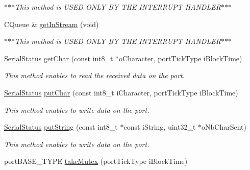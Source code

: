 \begin{DoxyCompactItemize}
\begin{DoxyCompactList}\small\item\em $\ast$$\ast$$\ast$\-This method is \-U\-S\-E\-D \-O\-N\-L\-Y \-B\-Y \-T\-H\-E \-I\-N\-T\-E\-R\-R\-U\-P\-T \-H\-A\-N\-D\-L\-E\-R$\ast$$\ast$$\ast$ \end{DoxyCompactList}\item 
\hypertarget{class_async_serial_port1_aca8bcbacddd2d46ca9460c3d9b232752}{\-C\-Queue \& \hyperlink{class_async_serial_port1_aca8bcbacddd2d46ca9460c3d9b232752}{get\-In\-Stream} (void)}\label{class_async_serial_port1_aca8bcbacddd2d46ca9460c3d9b232752}

\begin{DoxyCompactList}\small\item\em $\ast$$\ast$$\ast$\-This method is \-U\-S\-E\-D \-O\-N\-L\-Y \-B\-Y \-T\-H\-E \-I\-N\-T\-E\-R\-R\-U\-P\-T \-H\-A\-N\-D\-L\-E\-R$\ast$$\ast$$\ast$ \end{DoxyCompactList}\item 
\hyperlink{_serial_type_8h_a71c113451bfafdaf5fcabcd807acd480}{\-Serial\-Status} \hyperlink{class_async_serial_port1_abf7bce398cb06b5368f7a617bcbdf857}{get\-Char} (const int8\-\_\-t $\ast$o\-Character, port\-Tick\-Type i\-Block\-Time)
\begin{DoxyCompactList}\small\item\em \-This method enables to read the received data on the port. \end{DoxyCompactList}\item 
\hyperlink{_serial_type_8h_a71c113451bfafdaf5fcabcd807acd480}{\-Serial\-Status} \hyperlink{class_async_serial_port1_a414bdbd17f686e2a31f8109d4492b595}{put\-Char} (const int8\-\_\-t i\-Character, port\-Tick\-Type i\-Block\-Time)
\begin{DoxyCompactList}\small\item\em \-This method enables to write data on the port. \end{DoxyCompactList}\item 
\hyperlink{_serial_type_8h_a71c113451bfafdaf5fcabcd807acd480}{\-Serial\-Status} \hyperlink{class_async_serial_port1_a1f8e0292a566d5a16e993202a6ea9d1b}{put\-String} (const int8\-\_\-t $\ast$const i\-String, uint32\-\_\-t $\ast$o\-Nb\-Char\-Sent)
\begin{DoxyCompactList}\small\item\em \-This method enables to write data on the port. \end{DoxyCompactList}\item 
port\-B\-A\-S\-E\-\_\-\-T\-Y\-P\-E \hyperlink{class_async_serial_port1_a2be5dc99ca1c1edd5153a96f3336e6e8}{take\-Mutex} (port\-Tick\-Type i\-Block\-Time)

\end{DoxyCompactItemize}
